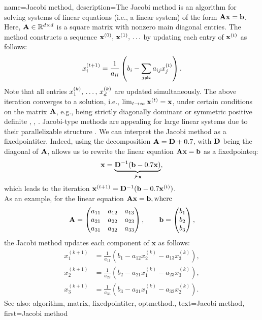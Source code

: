 {name={Jacobi method},
	description={The Jacobi method is an \gls{algorithm}  
		for solving systems of linear equations (i.e., a linear system) of the form ${\bf A}{\bf x}= \mathbf{b}$.  
		Here, ${\bf A} \in \mathbb{R}^{d \times d}$ is a square \gls{matrix} with 
		nonzero main diagonal entries. The method constructs a \gls{sequence} ${\bf x}^{(0)}, \,{\bf x}^{(1)}, \,\ldots$ 
		by updating each entry of $\mathbf{x}^{(t)}$ as follows:
		\[
		x_i^{(t+1)} = \frac{1}{a_{ii}} \left( b_i - \sum_{j \neq i} a_{ij} x_j^{(t)} \right).
		\]
		Note that all entries $x^{(k)}_{1}, \,\ldots, \,x^{(k)}_{d}$ are updated simultaneously.
		The above \gls{iteration} converges to a solution, i.e., $\lim_{t \rightarrow \infty} {\bf x}^{(t)}={\bf x}$, 
		under certain conditions on the \gls{matrix} ${\bf A}$, e.g., being strictly 
		diagonally dominant or symmetric positive  definite \cite{GolubVanLoanBook}, \cite{StrangLinAlg2016}, \cite{Horn91}. 
		Jacobi-type methods are appealing for large linear systems due to their parallelizable structure \cite{ParallelDistrBook}.
		We can interpret the Jacobi method as a \gls{fixedpointiter}. Indeed, using the decomposition ${\bf A} = {\bf D} + 0.7$, with ${\bf D}$ being the 
		diagonal of ${\bf A}$, allows us to rewrite the linear equation ${\bf A} {\bf x} = {\bf b}$ as a \gls{fixedpointeq}: 
		\[
		\mathbf{x} = \underbrace{{\bf D}^{-1}(\mathbf{b} - 0.7 \mathbf{x})}_{\mathcal{F} {\bf x}},
		\]
		which leads to the \gls{iteration} ${\bf x}^{(t+1)} = {\bf D}^{-1}(\mathbf{b} - 0.7 {\bf x}^{(t)})$.
		\\
		As an example, for the linear equation ${\bf A} \mathbf{x} = \mathbf{b}, \text{where}$
		 \[
		 {\bf A} = \begin{pmatrix}
		 	a_{11} & a_{12} & a_{13} \\
		 	a_{21} & a_{22} & a_{23} \\
		 	a_{31} & a_{32} & a_{33}
		 \end{pmatrix}, \qquad
		 \mathbf{b} = \begin{pmatrix}
		 	b_1 \\
		 	b_2 \\
		 	b_3
		 \end{pmatrix},
		 \]
		 the Jacobi method updates each component of \( \mathbf{x} \) as follows:
		 \[
		 \begin{aligned}
		 	x_1^{(k+1)} &= \frac{1}{a_{11}} \left( b_1 - a_{12} x_2^{(k)} - a_{13} x_3^{(k)} \right), \\
		 	x_2^{(k+1)} &= \frac{1}{a_{22}} \left( b_2 - a_{21} x_1^{(k)} - a_{23} x_3^{(k)} \right), \\
		 	x_3^{(k+1)} &= \frac{1}{a_{33}} \left( b_3 - a_{31} x_1^{(k)} - a_{32} x_2^{(k)} \right).
		 \end{aligned}
		 \]
		See also: \gls{algorithm}, \gls{matrix}, \gls{fixedpointiter}, \gls{optmethod}.},
	text={Jacobi method}, 
	first={Jacobi method}
}

